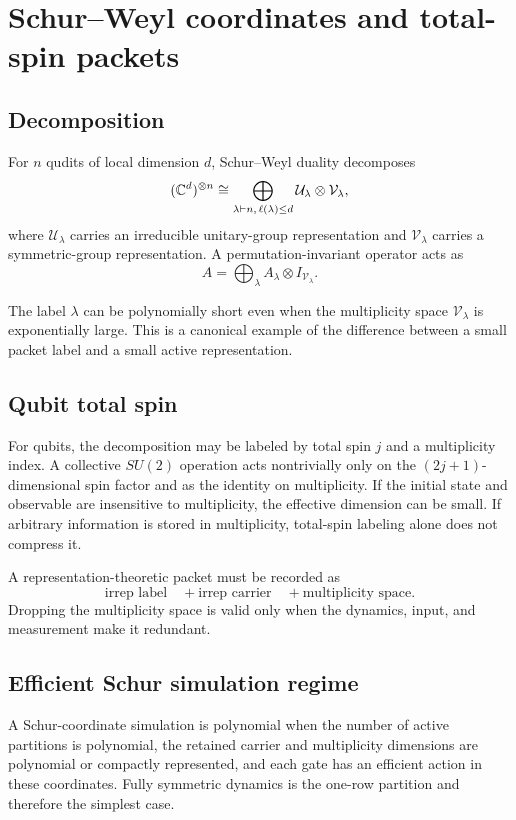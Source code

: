 \chapter{Schur--Weyl coordinates and total-spin packets}
\label{ch:schur}

\section{Decomposition}
For $n$ qudits of local dimension $d$, Schur--Weyl duality decomposes
\[
(\mathbb C^d)^{\otimes n}
\cong
\bigoplus_{\lambda\vdash n,\,\ell(\lambda)\le d}
\mathcal U_\lambda\otimes\mathcal V_\lambda,
\]
where $\mathcal U_\lambda$ carries an irreducible unitary-group representation and $\mathcal V_\lambda$ carries a symmetric-group representation. A permutation-invariant operator acts as
\[
A
=
\bigoplus_\lambda
A_\lambda\otimes I_{\mathcal V_\lambda}.
\]

The label $\lambda$ can be polynomially short even when the multiplicity space $\mathcal V_\lambda$ is exponentially large. This is a canonical example of the difference between a small packet label and a small active representation.

\section{Qubit total spin}
For qubits, the decomposition may be labeled by total spin $j$ and a multiplicity index. A collective $SU(2)$ operation acts nontrivially only on the $(2j+1)$-dimensional spin factor and as the identity on multiplicity. If the initial state and observable are insensitive to multiplicity, the effective dimension can be small. If arbitrary information is stored in multiplicity, total-spin labeling alone does not compress it.

\begin{principle}
A representation-theoretic packet must be recorded as
\[
\text{irrep label}
\quad+
\text{irrep carrier}
\quad+
\text{multiplicity space}.
\]
Dropping the multiplicity space is valid only when the dynamics, input, and measurement make it redundant.
\end{principle}

\section{Efficient Schur simulation regime}
A Schur-coordinate simulation is polynomial when the number of active partitions is polynomial, the retained carrier and multiplicity dimensions are polynomial or compactly represented, and each gate has an efficient action in these coordinates. Fully symmetric dynamics is the one-row partition and therefore the simplest case.

